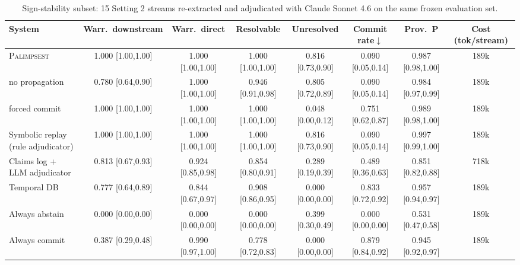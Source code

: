 \begin{table}\centering\footnotesize\setlength{\tabcolsep}{3.5pt}
\caption{Sign-stability subset: 15 Setting 2 streams re-extracted and adjudicated with Claude Sonnet 4.6 on the same frozen evaluation set.}\label{tab:s2strong}
\begin{tabular}{lccccccc}
\toprule
System & Warr.\ downstream & Warr.\ direct & Resolvable & Unresolved & Commit rate$\downarrow$ & Prov.\ P & Cost (tok/stream) \\
\midrule
\textsc{Palimpsest} & 1.000 {\tiny[1.00,1.00]} & 1.000 {\tiny[1.00,1.00]} & 1.000 {\tiny[1.00,1.00]} & 0.816 {\tiny[0.73,0.90]} & 0.090 {\tiny[0.05,0.14]} & 0.987 {\tiny[0.98,1.00]} & 189k \\
\quad no propagation & 0.780 {\tiny[0.64,0.90]} & 1.000 {\tiny[1.00,1.00]} & 0.946 {\tiny[0.91,0.98]} & 0.805 {\tiny[0.72,0.89]} & 0.090 {\tiny[0.05,0.14]} & 0.984 {\tiny[0.97,0.99]} & 189k \\
\quad forced commit & 1.000 {\tiny[1.00,1.00]} & 1.000 {\tiny[1.00,1.00]} & 1.000 {\tiny[1.00,1.00]} & 0.048 {\tiny[0.00,0.12]} & 0.751 {\tiny[0.62,0.87]} & 0.989 {\tiny[0.98,1.00]} & 189k \\
Symbolic replay (rule adjudicator) & 1.000 {\tiny[1.00,1.00]} & 1.000 {\tiny[1.00,1.00]} & 1.000 {\tiny[1.00,1.00]} & 0.816 {\tiny[0.73,0.90]} & 0.090 {\tiny[0.05,0.14]} & 0.997 {\tiny[0.99,1.00]} & 189k \\
Claims log + LLM adjudicator & 0.813 {\tiny[0.67,0.93]} & 0.924 {\tiny[0.85,0.98]} & 0.854 {\tiny[0.80,0.91]} & 0.289 {\tiny[0.19,0.39]} & 0.489 {\tiny[0.36,0.63]} & 0.851 {\tiny[0.82,0.88]} & 718k \\
Temporal DB & 0.777 {\tiny[0.64,0.89]} & 0.844 {\tiny[0.67,0.97]} & 0.908 {\tiny[0.86,0.95]} & 0.000 {\tiny[0.00,0.00]} & 0.833 {\tiny[0.72,0.92]} & 0.957 {\tiny[0.94,0.97]} & 189k \\
Always abstain & 0.000 {\tiny[0.00,0.00]} & 0.000 {\tiny[0.00,0.00]} & 0.000 {\tiny[0.00,0.00]} & 0.399 {\tiny[0.30,0.49]} & 0.000 {\tiny[0.00,0.00]} & 0.531 {\tiny[0.47,0.58]} & 189k \\
Always commit & 0.387 {\tiny[0.29,0.48]} & 0.990 {\tiny[0.97,1.00]} & 0.778 {\tiny[0.72,0.83]} & 0.000 {\tiny[0.00,0.00]} & 0.879 {\tiny[0.84,0.92]} & 0.945 {\tiny[0.92,0.97]} & 189k \\
\bottomrule
\end{tabular}
\end{table}